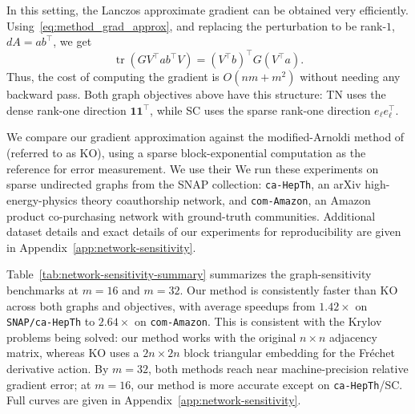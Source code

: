 \documentclass{article}
\begin{document}
In this setting, the Lanczos approximate gradient can be obtained very efficiently. Using~\eqref{eq:method_grad_approx}, and replacing the perturbation to be rank-$1$, $dA=ab^\top$, we get
\begin{equation}
    \operatorname{tr}\!\left(G V^\top a b^\top V\right)
    =
    (V^\top b)^\top G (V^\top a).
    \label{eq:exp_rank_one_contraction}
\end{equation}
Thus, the cost of computing the gradient is
$O(nm+m^2)$ without needing any backward pass. Both graph objectives above have this structure: TN uses the dense
rank-one direction $\mathbf{1}\mathbf{1}^\top$, while SC uses the sparse rank-one direction
$e_\ell e_\ell^\top$.

We compare our gradient approximation against the modified-Arnoldi
method of \citet{kressner2026} (referred to as KO), using a sparse block-exponential computation as the
reference for error measurement. We use their 
We run these experiments on sparse undirected graphs from the SNAP collection: \texttt{ca-HepTh}, an
arXiv high-energy-physics theory coauthorship network, and \texttt{com-Amazon}, an
Amazon product co-purchasing network with ground-truth communities. Additional dataset
details and exact details of our experiments for reproducibility are given in Appendix~\ref{app:network-sensitivity}.


Table~\ref{tab:network-sensitivity-summary} summarizes the graph-sensitivity
benchmarks at \(m=16\) and \(m=32\). Our method is consistently faster than KO across
both graphs and objectives, with average speedups from \(1.42\times\) on
\texttt{SNAP/ca-HepTh} to \(2.64\times\) on \texttt{com-Amazon}. This is consistent
with the Krylov problems being solved: our method works with the original \(n\times n\)
adjacency matrix, whereas KO uses a \(2n\times 2n\) block triangular embedding for the
Fr\'echet derivative action. By \(m=32\), both methods reach near machine-precision
relative gradient error; at \(m=16\), our method is more accurate except on
\texttt{ca-HepTh}/SC. Full curves are given in
Appendix~\ref{app:network-sensitivity}.
\end{document}
